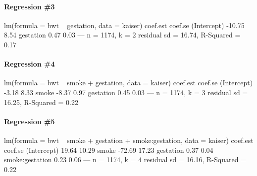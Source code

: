 \documentclass[addpoints,12pt]{exam}
\begin{document}
\paragraph{\footnotesize Regression \#3}
\begin{boxedverbatim}
lm(formula = bwt ~ gestation, data = kaiser)
            coef.est coef.se
(Intercept) -10.75     8.54
gestation     0.47     0.03
---
n = 1174, k = 2
residual sd = 16.74, R-Squared = 0.17
\end{boxedverbatim}

\paragraph{\footnotesize Regression \#4}
\begin{boxedverbatim}
lm(formula = bwt ~ smoke + gestation, data = kaiser)
            coef.est coef.se
(Intercept) -3.18     8.33
smoke       -8.37     0.97
gestation    0.45     0.03
---
n = 1174, k = 3
residual sd = 16.25, R-Squared = 0.22
\end{boxedverbatim}

\paragraph{\footnotesize Regression \#5}
\begin{boxedverbatim}
lm(formula = bwt ~ smoke + gestation + smoke:gestation, data = kaiser)
                coef.est coef.se
(Intercept)      19.64    10.29
smoke           -72.69    17.23
gestation         0.37     0.04
smoke:gestation   0.23     0.06
---
n = 1174, k = 4
residual sd = 16.16, R-Squared = 0.22
\end{boxedverbatim}
\end{document}
